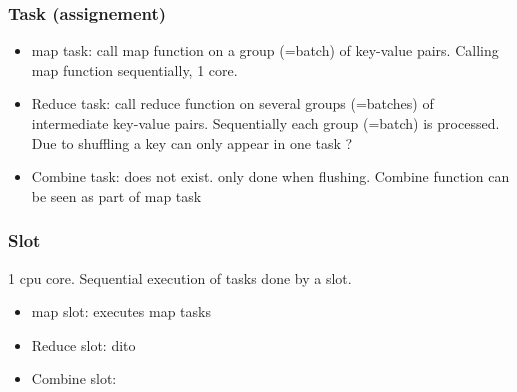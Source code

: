 \subsubsection{Task (assignement)}

\begin{itemize}
    \item map task: call map function on a group (=batch) of key-value pairs. Calling map function sequentially, 1 core.
    \item Reduce task: call reduce function on several groups (=batches) of intermediate key-value pairs.
    Sequentially each group (=batch) is processed. Due to shuffling a key can only appear in one task ?
    \item Combine task: does not exist. only done when flushing. Combine function can be seen as part of map task
\end{itemize}


\subsubsection{Slot}
1 cpu core.  Sequential execution of tasks done by a slot.
\begin{itemize}
    \item map slot: executes map tasks
    \item Reduce slot: dito
    \item Combine slot:
\end{itemize}







